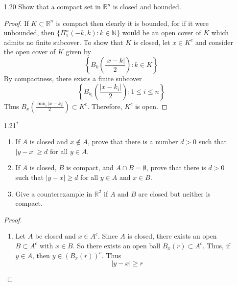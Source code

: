 \begin{enumerate}
    \item[1.20] Show that a compact set in \( \mathbb{R}^n \) is closed and bounded.
    
    \begin{proof}
    If \( K \subset \mathbb{R}^n \) is compact then clearly it is bounded, for if it were unbounded, then \( \{ \Pi_1^n (-k,k) : k \in \mathbb{N} \} \) would be an open cover of \( K \) which admits no finite subcover. To show that \( K \) is closed, let \( x \in K^c \) and consider the open cover of \( K \) given by
    \[
    \left\{ B_k\left( \frac{\left| x-k \right|}{2} \right): k \in K \right\}
    \]
    By compactness, there exists a finite subcover
    \[
    \left\{ B_{k_i}\left( \frac{\left| x-k_i \right|}{2} \right): 1 \leq i \leq n \right\}
    \]
    Thus \( B_x\left( \frac{\min_i \left| x-k_i \right|}{2} \right) \subset K^c \). Therefore, \( K^c \) is open. 
    \end{proof}
    
    \item[1.21\(^*\)] \begin{enumerate}
        \item If \( A \) is closed and \( x \not\in A \), prove that there is a number \( d > 0 \) such that \( \left| y -x \right| \geq d \) for all \( y \in A \).
        
        \item If \( A \) is closed, \( B \) is compact, and \( A \cap B = \emptyset \), prove that there is \( d > 0 \) such that \( \left| y - x \right| \geq d \) for all \( y \in A \) and \( x \in B \).
        
        \item Give a counterexample in \( \mathbb{R}^2 \) if \( A \) and \( B \) are closed but neither is compact.
    \end{enumerate}
    
    \begin{proof}
    \begin{enumerate}
        \item Let \( A \) be closed and \( x \in A^c \). Since \( A \) is closed, there exists an open \( B \subset A^c \) with \( x \in B \). So there exists an open ball \( B_x(r) \subset A^c \). Thus, if \( y \in A \), then \( y \in \left( B_x(r) \right)^c \). Thus
        \[
        \left| y - x \right| \geq r 
        \]
        

\end{enumerate}
\end{proof}
\end{enumerate}
